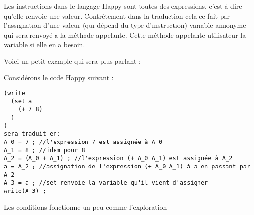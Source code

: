 Les instructions dans le langage Happy sont toutes des expressions, c'est-à-dire qu'elle renvoie une valeur. Contrètement dans la traduction
cela ce fait par l'assignation d'une valeur (qui dépend du type d'instruction) variable annonyme qui sera renvoyé à la méthode appelante. Cette méthode
appelante utilisateur la variable si elle en a besoin.

Voici un petit exemple qui sera plus parlant :

Considérons le code Happy suivant :
\begin{verbatim}
(write 
  (set a 
    (+ 7 8)
  )
)
sera traduit en:
A_0 = 7 ; //l'expression 7 est assignée à A_0
A_1 = 8 ; //idem pour 8
A_2 = (A_0 + A_1) ; //l'expression (+ A_0 A_1) est assignée à A_2
a = A_2 ; //assignation de l'expression (+ A_0 A_1) à a en passant par A_2
A_3 = a ; //set renvoie la variable qu'il vient d'assigner
write(A_3) ;

\end{verbatim}

Les conditions fonctionne un peu comme l'exploration 


